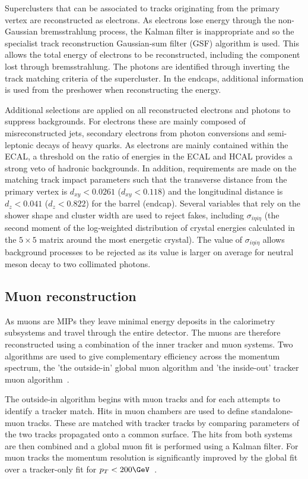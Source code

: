 Superclusters that can be associated to tracks originating from the primary vertex are reconstructed as electrons.
As electrons lose energy through the non-Gaussian bremsstrahlung process, the Kalman filter is inappropriate and
so the specialist track reconstruction Gaussian-sum filter (GSF) algorithm is used. This allows the total energy of
electrons to be reconstructed, including the component lost through bremsstrahlung. The photons are identified 
through inverting the track matching criteria of the supercluster. In the endcaps, additional information
is used from the preshower when reconstructing the energy.

Additional selections are applied on all reconstructed electrons and photons to suppress backgrounds.
For electrons these are mainly composed of misreconstructed jets, secondary electrons from photon
conversions and semi-leptonic decays of heavy quarks. As electrons are mainly contained within 
the ECAL, a threshold on the ratio of energies in the ECAL and HCAL provides a strong veto of hadronic
backgrounds. In addition, requirements are made on the matching track impact
parameters such that the transverse distance from the primary vertex is $d_{xy} < 0.0261$ ($d_{xy} < 0.118$) 
and the longitudinal distance is $d_z < 0.041$ ($d_z < 0.822$) for the barrel (endcap). 
Several variables that rely on the shower shape and cluster width are used to
reject fakes, including $\sigma_{i\eta i\eta}$ (the second moment of the log-weighted
distribution of crystal energies calculated in the $5\times5$ matrix around the
most energetic crystal). The value of $\sigma_{i\eta i\eta}$ allows background
processes to be rejected as its value is larger on average for neutral meson decay to two collimated photons.

\subsection{Muon reconstruction}
\label{sec:muon_reco}

As muons are MIPs they leave minimal energy deposits in the calorimetry
subsystems and travel through the entire detector. The muons are therefore reconstructed using a 
combination of the inner tracker and muon systems. Two algorithms are used to 
give complementary efficiency across the momentum spectrum, the 'the outside-in' 
global muon algorithm and 'the inside-out' tracker muon algorithm~\cite{muon_reco}.

The outside-in algorithm begins with muon tracks and for each attempts to
identify a tracker match. Hits in muon chambers are used to define standalone-muon tracks. 
These are matched with tracker tracks by comparing parameters of the two tracks propagated 
onto a common surface. The hits from both systems are then combined and a global muon fit 
is performed using a Kalman filter. For muon tracks the momentum resolution is significantly improved by 
the global fit over a tracker-only fit for $p_T < 200\GeV$~\cite{CMS,muon_reco_cosmic}. 

